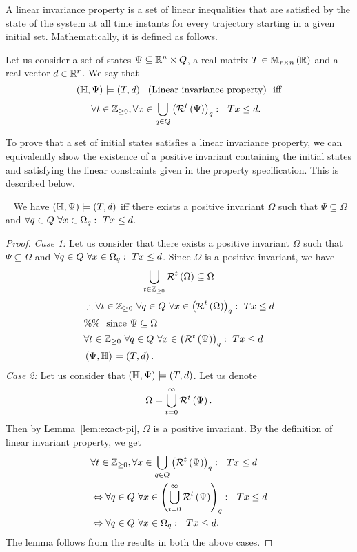 A linear invariance property is a set of linear inequalities that are
satisfied by the state of the system at all time instants for every
trajectory starting in a given initial set.  Mathematically, it is
defined as follows.
%
\begin{definition}
Let us consider a set of states
$\Psi\subseteq\mathbb{R}^n\times Q$, a real matrix 
${T\in\mathbb{M}_{r\times n}\left(\mathbb{R}\right)}$ and a real vector $d\in\mathbb{R}^r$.  We
say that \[\left(\mathbb{H},\Psi\right)\models\left(T,d\right)~~\text{(Linear invariance property)}~~\text{iff}\] 
%
\begin{align*}\
& \forall t\in\mathbb{Z}_{\geq 0},\forall
 x\in\bigcup_{q\in Q}\left(\mathcal{R}^{t}\left(\Psi\right)\right)_q:~~
 Tx\leq d.
\end{align*}
%
\end{definition}
%
To prove that a set of initial states satisfies a linear invariance
property, we can equivalently show the existence of a positive
invariant containing the initial states and satisfying the linear
constraints given in the property specification.  This is described below.
%
\begin{lemma}~\label{lem:pi-ver}
We have
$\left(\mathbb{H},\Psi\right)\models\left(T,d\right)$ iff there
exists a positive invariant $\Omega$ such that $\Psi\subseteq\Omega$
and $\forall q\in Q~\forall x\in\Omega_{q}:~Tx\leq d$.
\end{lemma}
%
\begin{proof}
{\it Case 1:} Let us consider that there exists a positive invariant
$\Omega$ such that $\Psi\subseteq\Omega$ and $\forall
q\in Q~\forall x\in\Omega_{q}:~Tx\leq d$.  Since
$\Omega$ is a positive invariant, we have
%
\[
\bigcup_{t\in\mathbb{Z}_{\geq 0}}\mathcal{R}^{t}\left(\Omega\right)\subseteq\Omega
\]
%
\begin{align*}
  & \therefore\forall t\in\mathbb{Z}_{\geq 0}~\forall q\in Q~\forall x\in\left(\mathcal{R}^{t}\left(\Omega\right)\right)_q:~Tx\leq d\\
  & \%\%~~\text{since}~\Psi\subseteq\Omega\\
  & \forall t\in\mathbb{Z}_{\geq 0}~\forall q\in Q~\forall x\in\left(\mathcal{R}^{t}\left(\Psi\right)\right)_{q}:~Tx\leq d\\
  & \left(\Psi,\mathbb{H}\right)\models\left(T,d\right).
\end{align*}
%
{\it Case 2:}  Let us consider that $\left(\mathbb{H},\Psi\right)\models\left(T,d\right)$.  Let us denote 
%
\[
\Omega=\bigcup_{t=0}^\infty\mathcal{R}^{t}\left(\Psi\right).
\]
% 
Then by Lemma~\ref{lem:exact-pi}, $\Omega$ is a positive invariant.  By
the definition of linear invariant property, we get 
%
\begin{align*}
& \forall t\in\mathbb{Z}_{\geq 0},\forall
 x\in\bigcup_{q\in Q}\left(\mathcal{R}^{t}\left(\Psi\right)\right)_q:~~
 Tx\leq d\\
 & \Leftrightarrow \forall q\in Q~\forall
x\in\left(\bigcup_{t=0}^\infty\mathcal{R}^{t}\left(\Psi\right)\right)_q:~~Tx\leq d\\
 & \Leftrightarrow \forall q\in Q~\forall
x\in\Omega_q:~~Tx\leq d.
\end{align*}
%
The lemma follows from the results in both the above cases.
\end{proof}
%
